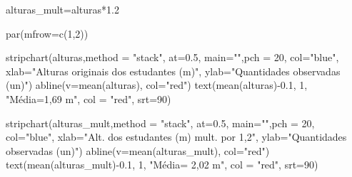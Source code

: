 \documentclass[
]{book}
\newenvironment{Shaded}{\begin{snugshade}}{\end{snugshade}}
\newcommand{\AttributeTok}[1]{\textcolor[rgb]{0.77,0.63,0.00}{#1}}
\newcommand{\DecValTok}[1]{\textcolor[rgb]{0.00,0.00,0.81}{#1}}
\newcommand{\FloatTok}[1]{\textcolor[rgb]{0.00,0.00,0.81}{#1}}
\newcommand{\FunctionTok}[1]{\textcolor[rgb]{0.00,0.00,0.00}{#1}}
\newcommand{\NormalTok}[1]{#1}
\newcommand{\OtherTok}[1]{\textcolor[rgb]{0.56,0.35,0.01}{#1}}
\newcommand{\SpecialCharTok}[1]{\textcolor[rgb]{0.00,0.00,0.00}{#1}}
\newcommand{\StringTok}[1]{\textcolor[rgb]{0.31,0.60,0.02}{#1}}
\begin{document}
\begin{Shaded}
\begin{Highlighting}[]
\NormalTok{alturas\_mult}\OtherTok{=}\NormalTok{alturas}\SpecialCharTok{*}\FloatTok{1.2}

\FunctionTok{par}\NormalTok{(}\AttributeTok{mfrow=}\FunctionTok{c}\NormalTok{(}\DecValTok{1}\NormalTok{,}\DecValTok{2}\NormalTok{))}

\FunctionTok{stripchart}\NormalTok{(alturas,}\AttributeTok{method =} \StringTok{"stack"}\NormalTok{,  }\AttributeTok{at=}\FloatTok{0.5}\NormalTok{, }
\AttributeTok{main=}\StringTok{""}\NormalTok{,}\AttributeTok{pch =} \DecValTok{20}\NormalTok{,}
\AttributeTok{col=}\StringTok{"blue"}\NormalTok{,  }\AttributeTok{xlab=}\StringTok{"Alturas originais dos estudantes (m)"}\NormalTok{, }
\AttributeTok{ylab=}\StringTok{"Quantidades observadas (un)"}\NormalTok{)}
\FunctionTok{abline}\NormalTok{(}\AttributeTok{v=}\FunctionTok{mean}\NormalTok{(alturas), }\AttributeTok{col=}\StringTok{"red"}\NormalTok{) }
\FunctionTok{text}\NormalTok{(}\FunctionTok{mean}\NormalTok{(alturas)}\SpecialCharTok{{-}}\FloatTok{0.1}\NormalTok{, }\DecValTok{1}\NormalTok{, }\StringTok{"Média=1,69 m"}\NormalTok{, }\AttributeTok{col =} \StringTok{"red"}\NormalTok{, }\AttributeTok{srt=}\DecValTok{90}\NormalTok{) }


\FunctionTok{stripchart}\NormalTok{(alturas\_mult,}\AttributeTok{method =} \StringTok{"stack"}\NormalTok{,  }\AttributeTok{at=}\FloatTok{0.5}\NormalTok{, }
\AttributeTok{main=}\StringTok{""}\NormalTok{,}\AttributeTok{pch =} \DecValTok{20}\NormalTok{,}
\AttributeTok{col=}\StringTok{"blue"}\NormalTok{,  }\AttributeTok{xlab=}\StringTok{"Alt. dos estudantes (m) mult. por 1,2"}\NormalTok{, }
\AttributeTok{ylab=}\StringTok{"Quantidades observadas (un)"}\NormalTok{)}
\FunctionTok{abline}\NormalTok{(}\AttributeTok{v=}\FunctionTok{mean}\NormalTok{(alturas\_mult), }\AttributeTok{col=}\StringTok{"red"}\NormalTok{) }
\FunctionTok{text}\NormalTok{(}\FunctionTok{mean}\NormalTok{(alturas\_mult)}\SpecialCharTok{{-}}\FloatTok{0.1}\NormalTok{, }\DecValTok{1}\NormalTok{, }\StringTok{"Média= 2,02 m"}\NormalTok{, }\AttributeTok{col =} \StringTok{"red"}\NormalTok{, }\AttributeTok{srt=}\DecValTok{90}\NormalTok{) }
\end{Highlighting}
\end{Shaded}
\end{document}
